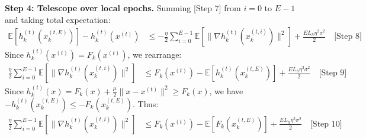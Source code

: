 \documentclass{article}
\begin{document}
\textbf{Step 4: Telescope over local epochs.} Summing [Step 7] from $i=0$ to $E-1$ and taking total expectation:
\begin{align*}
\mathbb{E}[h_k^{(t)}(x_k^{(t,E)})] - h_k^{(t)}(x^{(t)}) &\leq - \frac{\eta}{2} \sum_{i=0}^{E-1} \mathbb{E}[\|\nabla h_k^{(t)}(x_k^{(t,i)})\|^2] + \frac{E L_h \eta^2 \sigma^2}{2} \quad \text{[Step 8]}
\end{align*}
Since $h_k^{(t)}(x^{(t)}) = F_k(x^{(t)})$, we rearrange:
\begin{align*}
\frac{\eta}{2} \sum_{i=0}^{E-1} \mathbb{E}[\|\nabla h_k^{(t)}(x_k^{(t,i)})\|^2] &\leq F_k(x^{(t)}) - \mathbb{E}[h_k^{(t)}(x_k^{(t,E)})] + \frac{E L_h \eta^2 \sigma^2}{2} \quad \text{[Step 9]}
\end{align*}
Since $h_k^{(t)}(x) = F_k(x) + \frac{\mu}{2}\|x - x^{(t)}\|^2 \geq F_k(x)$, we have $-h_k^{(t)}(x_k^{(t,E)}) \leq -F_k(x_k^{(t,E)})$. Thus:
\begin{align*}
\frac{\eta}{2} \sum_{i=0}^{E-1} \mathbb{E}[\|\nabla h_k^{(t)}(x_k^{(t,i)})\|^2] &\leq F_k(x^{(t)}) - \mathbb{E}[F_k(x_k^{(t,E)})] + \frac{E L_h \eta^2 \sigma^2}{2} \quad \text{[Step 10]}
\end{align*}
\end{document}
